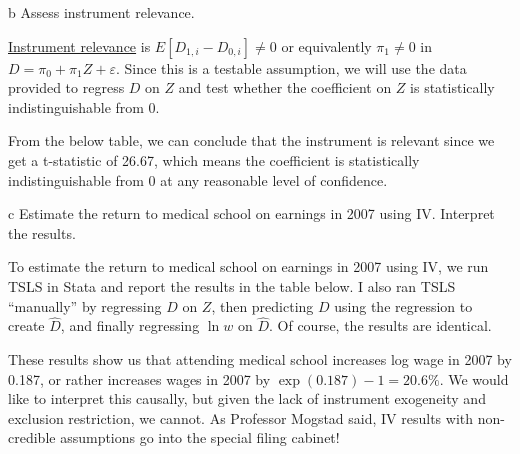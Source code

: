 \documentclass{article}
\begin{document}
\begin{problem}{b}
Assess instrument relevance.
\end{problem}
\begin{solution}
\underline{Instrument relevance} is $E[D_{1,i}-D_{0,i}]\neq 0$ or equivalently $\pi_1 \neq 0$ in $D = \pi_0 + \pi_1 Z + \varepsilon$. Since this is a testable assumption, we will use the data provided to regress $D$ on $Z$ and test whether the coefficient on $Z$ is statistically indistinguishable from 0.

From the below table, we can conclude that the instrument is relevant since we get a t-statistic of 26.67, which means the coefficient is statistically indistinguishable from 0 at any reasonable level of confidence.



\end{solution}

\begin{problem}{c}
Estimate the return to medical school on earnings in 2007 using IV. Interpret the results.
\end{problem}
\begin{solution}
To estimate the return to medical school on earnings in 2007 using IV, we run TSLS in Stata and report the results in the table below. I also ran TSLS ``manually'' by regressing $D$ on $Z$, then predicting $D$ using the regression to create $\widehat{D}$, and finally regressing $\ln w$ on $\widehat{D}$. Of course, the results are identical.

%

These results show us that attending medical school increases log wage in 2007 by 0.187, or rather increases wages in 2007 by $\exp(0.187)-1=20.6\%$. We would like to interpret this causally, but given the lack of instrument exogeneity and exclusion restriction, we cannot. As Professor Mogstad said, IV results with non-credible assumptions go into the special filing cabinet!
\end{solution}
\end{document}
